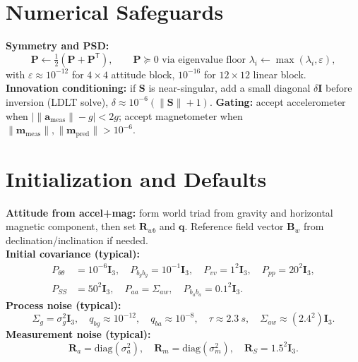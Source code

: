 \documentclass[11pt]{article}
\newcommand{\vect}[1]{\bm{#1}}
\newcommand{\mat}[1]{\bm{#1}}
\newcommand{\quat}[1]{\mathbf{#1}}
\newcommand{\T}{\mathsf{T}}
\newcommand{\I}{\mat{I}}
\begin{document}
\section{Numerical Safeguards}
\label{sec:numerics}
\textbf{Symmetry and PSD:}
\begin{equation}
  \mat{P} \leftarrow \tfrac12(\mat{P}+\mat{P}^{\T}),\qquad
  \mat{P} \succeq 0 \text{ via eigenvalue floor } \lambda_i \leftarrow \max(\lambda_i,\varepsilon),
  \label{eq:psd}
\end{equation}
with \(\varepsilon\approx 10^{-12}\) for \(4\times4\) attitude block, \(10^{-16}\) for \(12\times12\) linear block.
\textbf{Innovation conditioning:} if \(\mat{S}\) is near-singular, add a small diagonal
\(\delta \I\) before inversion (LDLT solve), \(\delta \approx 10^{-6}(\|\mat{S}\|+1)\).
\textbf{Gating:} accept accelerometer when \(|\|\vect{a}_{\mathrm{meas}}\|-g|<2g\);
accept magnetometer when \(\|\vect{m}_{\mathrm{meas}}\|,\|\vect{m}_{\mathrm{pred}}\|>10^{-6}\).

\section{Initialization and Defaults}
\label{sec:init}
\textbf{Attitude from accel+mag:} form world triad from gravity and horizontal magnetic
component, then set \(\mat{R}_{wb}\) and \(\quat{q}\). Reference field vector \(\vect{B}_w\) from
declination/inclination if needed.\\
\textbf{Initial covariance (typical):}
\begin{align}
  P_{\theta\theta} &= 10^{-6}\I_3, \quad
  P_{b_g b_g} = 10^{-1}\I_3, \quad
  P_{vv} = 1^2\I_3, \quad
  P_{pp} = 20^2\I_3, \\
  P_{SS} &= 50^2\I_3, \quad
  P_{aa} = \Sigma_{aw}, \quad
  P_{b_a b_a} = 0.1^2\I_3.
  \label{eq:P0}
\end{align}
\textbf{Process noise (typical):}
\begin{equation}
  \Sigma_g = \sigma_g^2 \I_3,\quad q_{bg}\approx 10^{-12},\quad
  q_{ba}\approx 10^{-8},\quad
  \tau \approx \SI{2.3}{s},\quad
  \Sigma_{aw} \approx (2.4^2)\I_3.
  \label{eq:Q0}
\end{equation}
\textbf{Measurement noise (typical):}
\begin{equation}
  \mat{R}_a = \mathrm{diag}(\sigma_a^2),\quad
  \mat{R}_m = \mathrm{diag}(\sigma_m^2),\quad
  \mat{R}_S = 1.5^2 \I_3.
  \label{eq:R0}
\end{equation}

\appendix
\end{document}
